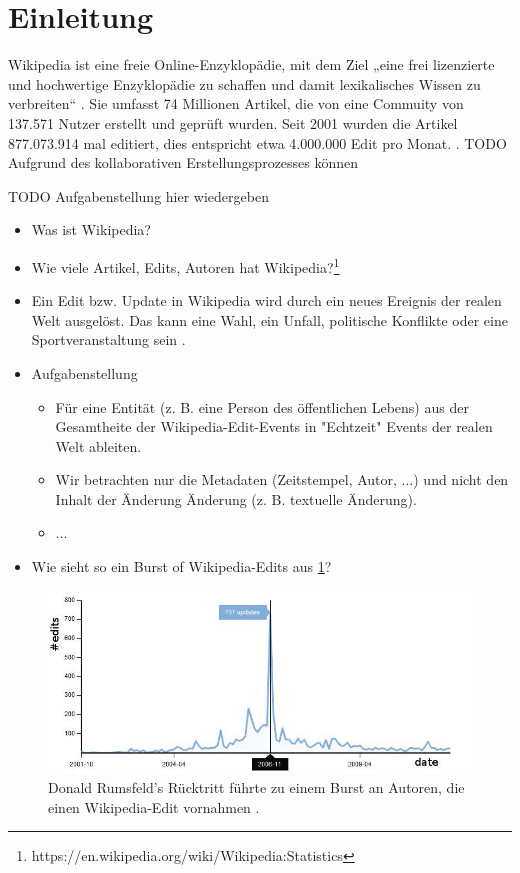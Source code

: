 \section{Einleitung}
Wikipedia ist eine freie Online-Enzyklopädie, mit dem Ziel „eine frei lizenzierte und hochwertige Enzyklopädie zu schaffen und damit lexikalisches Wissen zu verbreiten“ \cite{wales.}. Sie umfasst 74 Millionen Artikel, die von eine Commuity von 137.571 Nutzer erstellt und geprüft wurden. Seit 2001 wurden die Artikel 877.073.914 mal editiert, dies entspricht etwa 4.000.000 Edit pro Monat. \cite{wikistat}.
TODO
Aufgrund des kollaborativen Erstellungsprozesses können \cite{wikipedia.}

TODO
Aufgabenstellung hier wiedergeben

\begin{itemize}
    \item Was ist Wikipedia?
    \item Wie viele Artikel, Edits, Autoren hat Wikipedia?\footnote{https://en.wikipedia.org/wiki/Wikipedia:Statistics}
    \item Ein Edit bzw. Update in Wikipedia wird durch ein neues Ereignis der realen Welt ausgelöst. Das kann eine Wahl,
    ein Unfall, politische Konflikte oder eine Sportveranstaltung sein \cite{10.1007978-3-642-36973-5_22}.
    \item Aufgabenstellung
    \begin{itemize}
        \item Für eine Entität (z. B. eine Person des öffentlichen Lebens) aus der Gesamtheite der Wikipedia-Edit-Events in "Echtzeit"
        Events der realen Welt ableiten.
        \item Wir betrachten nur die Metadaten (Zeitstempel, Autor, ...) und nicht den Inhalt der Änderung Änderung (z. B. textuelle Änderung).
        \item ...
    \end{itemize}
    \item Wie sieht so ein Burst of Wikipedia-Edits aus \ref{fig:donald_rumsfelds_resignation_burst}?
\end{itemize}


\begin{figure}[h]
    \includegraphics[width=.5\textwidth]{images/Extracting_EventRelated_Information_from_Article.jpg}
    \caption{Donald Rumsfeld’s Rücktritt führte zu einem Burst an Autoren, die einen Wikipedia-Edit vornahmen \cite{10.1007978-3-642-36973-5_22}.}
    \label{fig:donald_rumsfelds_resignation_burst}
\end{figure}
